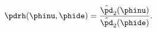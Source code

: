 \begin{equation}
  \pdrh(\phinu, \phide) = \frac {
    \hat{\pd}_{2}(\phinu) 
  } {
    \hat{\pd}_{2}(\phide)
  }.
  \label{eqn:self-ratio-estimate}
\end{equation}